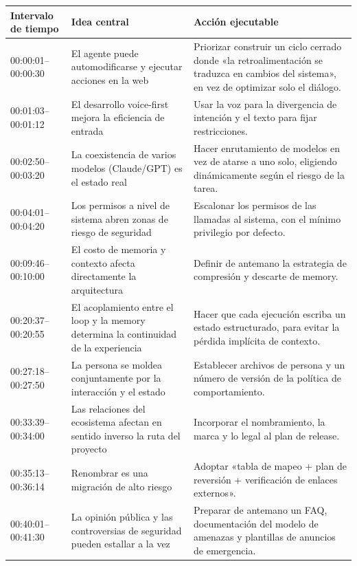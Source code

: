 \documentclass[a4paper]{article}
\begin{document}
\begin{longtable}{p{}p{}p{}}
\toprule
\textbf{Intervalo de tiempo} & \textbf{Idea central} & \textbf{Acción ejecutable} \\
\midrule
00:00:01--00:00:30 & El agente puede automodificarse y ejecutar acciones en la web & Priorizar construir un ciclo cerrado donde «la retroalimentación se traduzca en cambios del sistema», en vez de optimizar solo el diálogo. \\
\midrule
00:01:03--00:01:12 & El desarrollo voice-first mejora la eficiencia de entrada & Usar la voz para la divergencia de intención y el texto para fijar restricciones. \\
\midrule
00:02:50--00:03:20 & La coexistencia de varios modelos (Claude/GPT) es el estado real & Hacer enrutamiento de modelos en vez de atarse a uno solo, eligiendo dinámicamente según el riesgo de la tarea. \\
\midrule
00:04:01--00:04:20 & Los permisos a nivel de sistema abren zonas de riesgo de seguridad & Escalonar los permisos de las llamadas al sistema, con el mínimo privilegio por defecto. \\
\midrule
00:09:46--00:10:00 & El costo de memoria y contexto afecta directamente la arquitectura & Definir de antemano la estrategia de compresión y descarte de memory. \\
\midrule
00:20:37--00:20:55 & El acoplamiento entre el loop y la memory determina la continuidad de la experiencia & Hacer que cada ejecución escriba un estado estructurado, para evitar la pérdida implícita de contexto. \\
\midrule
00:27:18--00:27:50 & La persona se moldea conjuntamente por la interacción y el estado & Establecer archivos de persona y un número de versión de la política de comportamiento. \\
\midrule
00:33:39--00:34:00 & Las relaciones del ecosistema afectan en sentido inverso la ruta del proyecto & Incorporar el nombramiento, la marca y lo legal al plan de release. \\
\midrule
00:35:13--00:36:14 & Renombrar es una migración de alto riesgo & Adoptar «tabla de mapeo + plan de reversión + verificación de enlaces externos». \\
\midrule
00:40:01--00:41:30 & La opinión pública y las controversias de seguridad pueden estallar a la vez & Preparar de antemano un FAQ, documentación del modelo de amenazas y plantillas de anuncios de emergencia. \\

\end{longtable}
\end{document}
